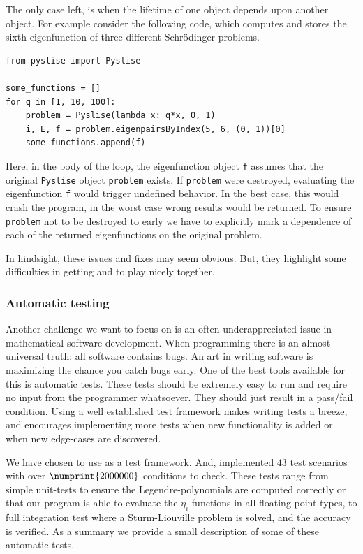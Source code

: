 The only case left, is when the lifetime of one object depends upon another object. For example consider the following \lpython{} code, which computes and stores the sixth eigenfunction of three different Schrödinger problems.
\begin{verbatim}
from pyslise import Pyslise

some_functions = []
for q in [1, 10, 100]:
    problem = Pyslise(lambda x: q*x, 0, 1)
    i, E, f = problem.eigenpairsByIndex(5, 6, (0, 1))[0]
    some_functions.append(f)
\end{verbatim}
Here, in the body of the loop, the eigenfunction object \texttt{f} assumes that the original \texttt{Pyslise} object \texttt{problem} exists. If \texttt{problem} were destroyed, evaluating the eigenfunction \texttt{f} would trigger undefined behavior. In the best case, this would crash the program, in the worst case wrong results would be returned. To ensure \texttt{problem} not to be destroyed to early we have to explicitly mark a dependence of each of the returned eigenfunctions on the original problem.

In hindsight, these issues and fixes may seem obvious. But, they highlight some difficulties in getting \lpython{} and \cpp{} to play nicely together.

\subsubsection{Automatic testing}

Another challenge we want to focus on is an often underappreciated issue in mathematical software development. When programming there is an almost universal truth: all software contains bugs. An art in writing software is maximizing the chance you catch bugs early. One of the best tools available for this is automatic tests. These tests should be extremely easy to run and require no input from the programmer whatsoever. They should just result in a pass/fail condition. Using a well established test framework makes writing tests a breeze, and encourages implementing more tests when new functionality is added or when new edge-cases are discovered.

We have chosen to use \catch{} \cite{_catchorg_2023} as a test framework. And, implemented $43$ test scenarios with over $\numprint{2000000}$ conditions to check. These tests range from simple unit-tests to ensure the Legendre-polynomials are computed correctly or that our program is able to evaluate the $\eta_i$ functions in all floating point types, to full integration test where a Sturm-Liouville problem is solved, and the accuracy is verified. As a summary we provide a small description of some of these automatic tests.

